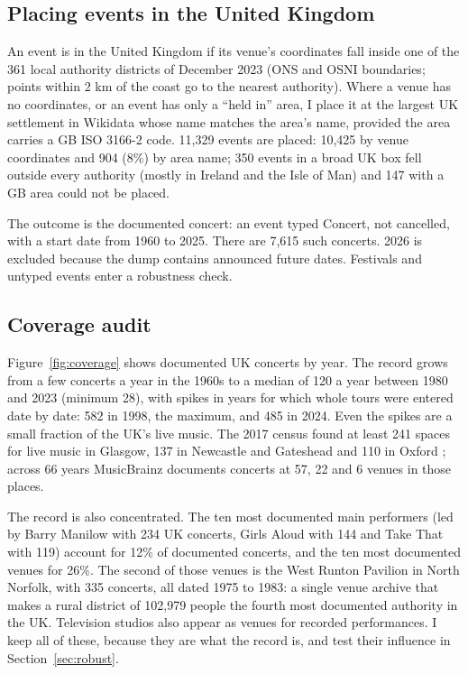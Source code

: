 \documentclass[11pt,a4paper]{article}
\begin{document}
\subsection{Placing events in the United Kingdom}
An event is in the United Kingdom if its venue's coordinates fall inside one of the 361 local authority districts of December 2023 (ONS and OSNI boundaries; points within 2 km of the coast go to the nearest authority). Where a venue has no coordinates, or an event has only a ``held in'' area, I place it at the largest UK settlement in Wikidata whose name matches the area's name, provided the area carries a GB ISO 3166-2 code. 11,329 events are placed: 10,425 by venue coordinates and 904 (8\%) by area name; 350 events in a broad UK box fell outside every authority (mostly in Ireland and the Isle of Man) and 147 with a GB area could not be placed.

The outcome is the documented concert: an event typed Concert, not cancelled, with a start date from 1960 to 2025. There are 7,615 such concerts. 2026 is excluded because the dump contains announced future dates. Festivals and untyped events enter a robustness check.

\subsection{Coverage audit}
Figure~\ref{fig:coverage} shows documented UK concerts by year. The record grows from a few concerts a year in the 1960s to a median of 120 a year between 1980 and 2023 (minimum 28), with spikes in years for which whole tours were entered date by date: 582 in 1998, the maximum, and 485 in 2024. Even the spikes are a small fraction of the UK's live music. The 2017 census found at least 241 spaces for live music in Glasgow, 137 in Newcastle and Gateshead and 110 in Oxford \citep{webster2018}; across 66 years MusicBrainz documents concerts at 57, 22 and 6 venues in those places.

The record is also concentrated. The ten most documented main performers (led by Barry Manilow with 234 UK concerts, Girls Aloud with 144 and Take That with 119) account for 12\% of documented concerts, and the ten most documented venues for 26\%. The second of those venues is the West Runton Pavilion in North Norfolk, with 335 concerts, all dated 1975 to 1983: a single venue archive that makes a rural district of 102,979 people the fourth most documented authority in the UK. Television studios also appear as venues for recorded performances. I keep all of these, because they are what the record is, and test their influence in Section~\ref{sec:robust}.
\end{document}
